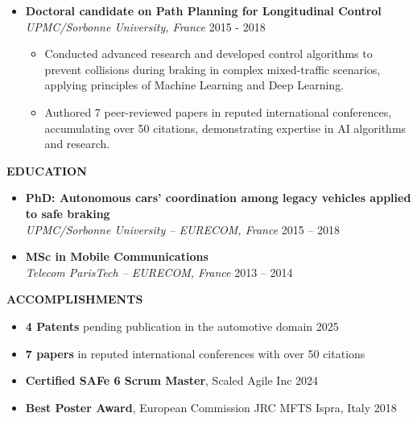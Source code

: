 \documentclass[a4paper,10pt]{article}
\begin{document}
\begin{itemize}[left=0pt, label={}]
    \item \textbf{Doctoral candidate on Path Planning for Longitudinal Control} \\
    \textit{UPMC/Sorbonne University, France} \hfill 2015 - 2018
    \begin{itemize}
        \item Conducted advanced research and developed control algorithms to prevent collisions during braking in complex mixed-traffic scenarios, applying principles of Machine Learning and Deep Learning.
        \item Authored 7 peer-reviewed papers in reputed international conferences, accumulating over 50 citations, demonstrating expertise in AI algorithms and research.
    \end{itemize}
\end{itemize}

\vspace{1mm}

\noindent \textbf{EDUCATION}
\vspace{0.5mm}
\begin{itemize}[left=0pt, label={}]
    \item \textbf{PhD: Autonomous cars' coordination among legacy vehicles applied to safe braking}\\
    \textit{UPMC/Sorbonne University – EURECOM, France} \hfill  2015 – 2018

    \item \textbf{MSc in Mobile Communications} \\
    \textit{Telecom ParisTech – EURECOM, France} \hfill  2013 –  2014
\end{itemize}


\noindent \textbf{ACCOMPLISHMENTS}
\begin{itemize}[left=0pt, label={}]
    \item \textbf{4 Patents} pending publication in the automotive domain \hfill 2025
    \item \textbf{7 papers} in reputed international conferences with over 50 citations
    \item \textbf{Certified SAFe 6 Scrum Master}, Scaled Agile Inc \hfill 2024
    \item \textbf{Best Poster Award}, European Commission JRC MFTS Ispra, Italy \hfill 2018
\end{itemize}

\vspace{1mm}
\end{document}
